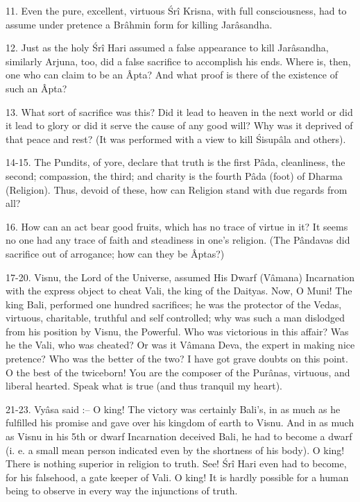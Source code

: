 11. Even the pure, excellent, virtuous \'Sr\^i Krisna, with full consciousness, had to assume under pretence a Br\^ahmin form for killing Jar\^asandha.

12. Just as the holy \'Sr\^i Hari assumed a false appearance to kill Jar\^asandha, similarly Arjuna, too, did a false sacrifice to accomplish his ends. Where is, then, one who can claim to be an \^Apta? And what proof is there of the existence of such an \^Apta?

13. What sort of sacrifice was this? Did it lead to heaven in the next world or did it lead to glory or did it serve the cause of any good will? Why was it deprived of that peace and rest? (It was performed with a view to kill \'Sisup\^ala and others).

14-15. The Pundits, of yore, declare that truth is the first P\^ada, cleanliness, the second; compassion, the third; and charity is the fourth P\^ada (foot) of Dharma (Religion). Thus, devoid of these, how can Religion stand with due regards from all?

16. How can an act bear good fruits, which has no trace of virtue in it? It seems no one had any trace of faith and steadiness in one's religion. (The P\^andavas did sacrifice out of arrogance; how can they be \^Aptas?)

17-20. Visnu, the Lord of the Universe, assumed His Dwarf (V\^amana) Incarnation with the express object to cheat Vali, the king of the Daityas. Now, O Muni! The king Bali, performed one hundred sacrifices; he was the protector of the Vedas, virtuous, charitable, truthful and self controlled; why was such a man dislodged from his position by Visnu, the Powerful. Who was victorious in this affair? Was he the Vali, who was cheated? Or was it V\^amana Deva, the expert in making nice pretence? Who was the better of the two? I have got grave doubts on this point. O the best of the twiceborn! You are the composer of the Pur\^anas, virtuous, and liberal hearted. Speak what is true (and thus tranquil my heart).

21-23. Vy\^asa said :-- O king! The victory was certainly Bali's, in as much as he fulfilled his promise and gave over his kingdom of earth to Visnu. And in as much as Visnu in his 5th or dwarf Incarnation deceived Bali, he had to become a dwarf (i. e. a small mean person indicated even by the shortness of his body). O king! There is nothing superior in religion to truth. See! \'Sr\^i Hari even had to become, for his falsehood, a gate keeper of Vali. O king! It is hardly possible for a human being to observe in every way the injunctions of truth.

